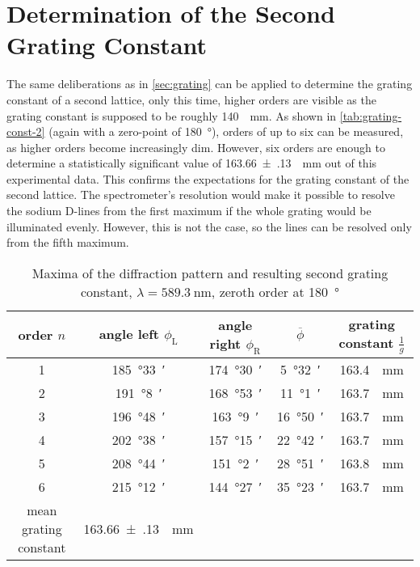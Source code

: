 \section{Determination of the Second Grating Constant}
The same deliberations as in \autoref{sec:grating} can be applied to determine the grating constant of a second lattice, only this time, higher orders are visible as the grating constant is supposed to be roughly \SI{140}{\per\mm}.
As shown in \autoref{tab:grating-const-2} (again with a zero-point of \SI{180}{\degree}), orders of up to six can be measured, as higher orders become increasingly dim.
However, six orders are enough to determine a statistically significant value of \SI{163.66(13)}{\per\mm} out of this experimental data.
This confirms the expectations for the grating constant of the second lattice.
The spectrometer's resolution would make it possible to resolve the sodium D-lines from the first maximum if the whole grating would be illuminated evenly.
However, this is not the case, so the lines can be resolved only from the fifth maximum.
\begin{table}[b!]
	\centering
	\caption[Maxima of the diffraction pattern and resulting second grating constant]{Maxima of the diffraction pattern and resulting second grating constant, $\lambda=\SI{589.3}{\nm}$, zeroth order at \SI{180}{\degree}}
	\label{tab:grating-const-2}
	\begin{tabular}{S|SSS|S}
		\toprule
		{order $n$}	&	{angle left $\phi_\text{L}$}	&	{angle right $\phi_\text{R}$}	&	{$\overline{\phi}$}	&	{grating constant $\frac{1}{g}$}\\
			&	\SI{185}{\degree}\SI{33}{\arcminute}	&	\SI{174}{\degree}\SI{30}{\arcminute}	&	\SI{5}{\degree}\SI{32}{\arcminute}	&	\SI{163.4}{\per\mm}	\\
		2	&	\SI{191}{\degree}\SI{8}{\arcminute}	&	\SI{168}{\degree}\SI{53}{\arcminute}	&	\SI{11}{\degree}\SI{1}{\arcminute}	&	\SI{163.7}{\per\mm}	\\
		3	&	\SI{196}{\degree}\SI{48}{\arcminute}	&	\SI{163}{\degree}\SI{9}{\arcminute}	&	\SI{16}{\degree}\SI{50}{\arcminute}	&	\SI{163.7}{\per\mm}	\\
		4	& \SI{202}{\degree}\SI{38}{\arcminute}	&	\SI{157}{\degree}\SI{15}{\arcminute}	&	\SI{22}{\degree}\SI{42}{\arcminute}	&	\SI{163.7}{\per\mm}	\\
		5	&	\SI{208}{\degree}\SI{44}{\arcminute}	&	\SI{151}{\degree}\SI{2}{\arcminute}	&	\SI{28}{\degree}\SI{51}{\arcminute}	&	\SI{163.8}{\per\mm}	\\
		6	&	\SI{215}{\degree}\SI{12}{\arcminute}	&	\SI{144}{\degree}\SI{27}{\arcminute}	&	\SI{35}{\degree}\SI{23}{\arcminute}	&	\SI{163.7}{\per\mm}	\\
		\midrule
		{mean grating constant}	&	\SI{163.66(13)}{\per\mm}\\
		\bottomrule
	\end{tabular}
\end{table}

